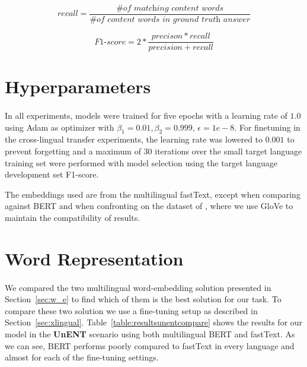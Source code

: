 \begin{equation}
    recall = \frac{\textit{\# of matching content words}}{\textit{\# of content words in ground truth answer}}
\label{eq:recall}
\end{equation}


\begin{equation}
    \textit{F1-score} = 2 * \frac{precison * recall}{precision + recall}
\label{eq:f1}
\end{equation}

\section{Hyperparameters}
\paragraph{}
In all experiments, models were trained for five epochs with a learning rate of $1.0$ using Adam \citep{kingma2014adam} as optimizer with $\beta_1 = 0.01, \beta_2 = 0.999$, $\epsilon = 1e - 8$. For finetuning in the cross-lingual transfer experiments, the learning rate was lowered to $0.001$ to prevent forgetting and a maximum of $30$ iterations over the small target language training set were performed with model selection using the target language development set F1-score. 

The embeddings used are from the multilingual fastText, except when comparing against BERT and when confronting on the dataset of \cite{levy2017zero}, where we use GloVe to maintain the compatibility of results. 


\section{Word Representation}
\paragraph{}
We compared the two multilingual word-embedding solution presented in Section~\ref{sec:w_e} to find which of them is the best solution for our task. To compare these two solution we use a fine-tuning setup as described in Section~\ref{sec:xlingual}. Table~\ref{table:resultsunentcompare} shows the results for our model in the \textbf{UnENT} scenario using both multilingual BERT and fastText. As we can see, BERT performs poorly compared to fastText in every language and almost for each of the fine-tuning settings. 

